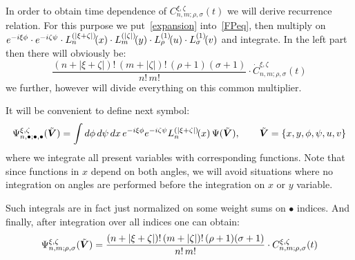 \documentclass[12pt, notitlepage]{report}
\begin{document}
In order to obtain time dependence of $C^{\xi, \zeta}_{n,m; \rho, \sigma}(t)$ we will derive recurrence relation. For this purpose we put~\eqref{expansion} into~\eqref{FPeq}, then multiply on $e^{-i\xi \phi} \cdot e^{-i\zeta \psi} \cdot  \Lagg{n}{|\xi+\zeta|}{x} \cdot \Lagg{m}{|\zeta|}{y} \cdot
\Lagg{\rho}{1}{u} \cdot \Lagg{\sigma}{1}{v}$ and integrate. In the left part then there will obviously be:
\begin{equation}
	\frac{(n+|\xi+\zeta|)!\,(m+|\zeta|)!\,(\rho+1)(\sigma+1)}{n!\,m!}\cdot \dot{C}^{\xi, \zeta}_{n,m; \rho, \sigma}(t)
\end{equation}
we further, however will divide everything on this common multiplier.

It will be convenient to define next symbol:
\newcommand{\tbV}{\tilde{\bV}}
\begin{equation}
	\Psi^{\xi,\zeta}_{n,\bullet;\bullet,\bullet}(\tbV) = \int d\phi\,d\psi\,dx \, e^{-i\xi\phi}e^{-i\zeta\psi}\Lagg{n}{|\xi+\zeta|}{x} \Psi(\tbV), \qquad \tbV = \left\{ x, y, \phi, \psi, u, v \right\}
\end{equation}
where we integrate all present variables with corresponding functions. Note that since functions in $x$ depend on both angles, we will avoid situations where no integration on angles are performed before the integration on $x$ or $y$ variable.

Such integrals are in fact just normalized on some weight sums on $\bullet$ indices. And finally, after integration over all indices one can obtain:
\begin{equation}
	\Psi^{\xi,\zeta}_{n,m;\rho,\sigma}(\tbV) = \frac{(n+|\xi+\zeta|)!\,(m+|\zeta|)!\,(\rho+1)(\sigma+1)}{n!\,m!}\cdot C^{\xi, \zeta}_{n,m; \rho, \sigma}(t)
\end{equation}
\end{document}
